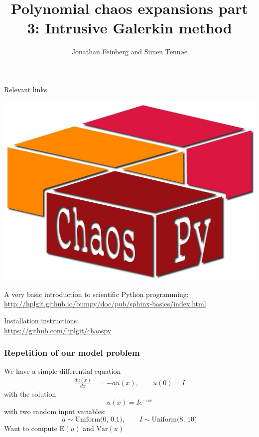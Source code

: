 \documentclass[handout]{beamer}
\title{Polynomial chaos expansions part 3: Intrusive Galerkin method}
\author{Jonathan Feinberg and Simen Tennøe}
\newcommand{\E}[1]{\mbox{E}\!\left( #1 \right)}
\newcommand{\Var}[1]{\mbox{Var}\!\left( #1 \right)}
\begin{document}
\begin{frame}
  \maketitle
\end{frame}



\begin{frame}[fragile]{Relevant links}
  \begin{center}
     \includegraphics[width=.5\textwidth]{chaospy_logo.jpg}
  \end{center}
    \begin{alert}{A very basic introduction to scientific Python programming:}
    \scriptsize
      \href{http://hplgit.github.io/bumpy/doc/pub/sphinx-basics/index.html}{http://hplgit.github.io/bumpy/doc/pub/sphinx-basics/index.html}\\
  \end{alert}
  \begin{alert}{Installation instructions:}\\
  \scriptsize
      \href{https://github.com/hplgit/chaospy}{https://github.com/hplgit/chaospy}\\
  \end{alert}
% 
\end{frame}


\begin{frame}
 \frametitle{Repetition of our model problem}
  We have a simple differential equation
  \begin{align*}
    \frac{d u(x)}{dx} & =-au(x),\qquad u(0) = I
  \end{align*}
  \pause
  with the solution
  \[u(x) = Ie^{-ax}\]
  \pause
  with two random input variables:
   \[a \sim \text{Uniform(0, 0.1)}, \qquad I \sim \text{Uniform(8, 10)}\]
  Want to compute $\E{u}$ and $\Var{u}$
\end{frame}
\end{document}
